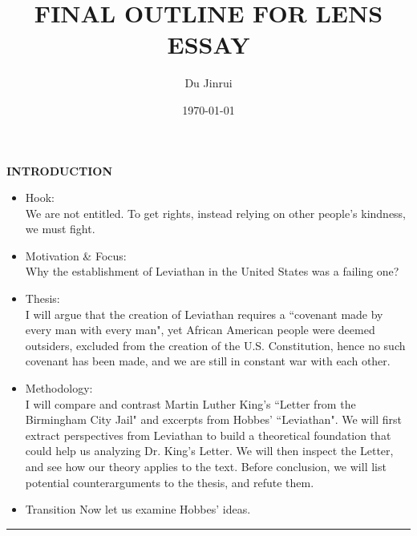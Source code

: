 \documentclass{article}
\title{FINAL OUTLINE FOR LENS ESSAY}
\author{Du Jinrui}
\date{\today}
\begin{document}
\maketitle

\begin{paracol}{3}
	\switchcolumn[0]
	\noindent \textbf{INTRODUCTION}
	\switchcolumn[2]
	\begin{itemize}
	\item Hook:\\
		We are not entitled. To get rights, instead relying on other people's kindness, we must fight.
	\item Motivation \& Focus:\\
		Why the establishment of Leviathan in the United States was a failing one?
	\item Thesis:\\
		I will argue that the creation of Leviathan requires a ``covenant made by every man with every man", yet African American people were deemed outsiders, excluded from the creation of the U.S. Constitution, hence no such covenant has been made, and we are still in constant war with each other.
	\item Methodology:\\
		I will compare and contrast Martin Luther King's ``Letter from the Birmingham City Jail" and excerpts from Hobbes' ``Leviathan". We will first extract perspectives from Leviathan to build a theoretical foundation that could help us analyzing Dr. King's Letter. We will then inspect the Letter, and see how our theory applies to the text. Before conclusion, we will list potential counterarguments to the thesis, and refute them.
	\item Transition
		Now let us examine Hobbes' ideas.
	\end{itemize}
\end{paracol}
\noindent\rule{16cm}{0.4pt}
{}
\end{document}
